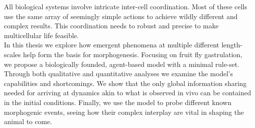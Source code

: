 All biological systems involve intricate inter-cell coordination. Most of these cells use the same array of seemingly simple actions to achieve wildly different and complex results. This coordination needs to robust and precise to make multicellular life feasible. \\

In this thesis we explore how emergent phenomena at multiple different length-scales help form the basis for morphogenesis. Focusing on fruit fly gastrulation, we propose a biologically founded, agent-based model with a minimal rule-set. Through both qualitative and quantitative analyses we examine the model's capabilities and shortcomings. We show that the only global information sharing needed for arriving at dynamics akin to what is observed in vivo can be contained in the initial conditions. Finally, we use the model to probe different known morphogenic events, seeing how their complex interplay are vital in shaping the animal to come.